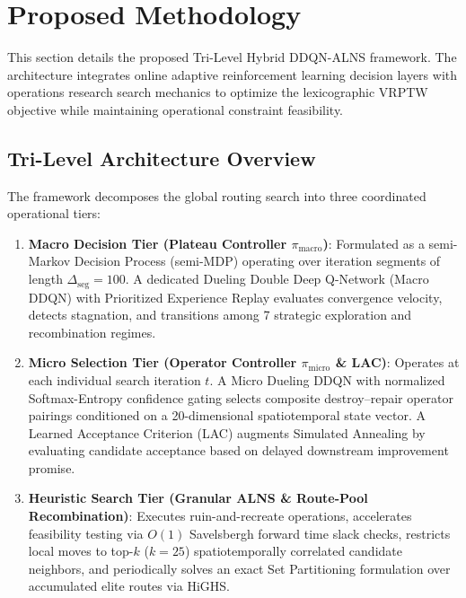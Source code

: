 \section{Proposed Methodology}
\label{sec:methodology}

This section details the proposed Tri-Level Hybrid DDQN-ALNS framework. The architecture integrates online adaptive reinforcement learning decision layers with operations research search mechanics to optimize the lexicographic VRPTW objective while maintaining operational constraint feasibility.

\subsection{Tri-Level Architecture Overview}
\label{sec:arch_overview}

The framework decomposes the global routing search into three coordinated operational tiers:
\begin{enumerate}
    \item \textbf{Macro Decision Tier (Plateau Controller $\pi_{\text{macro}}$)}: Formulated as a semi-Markov Decision Process (semi-MDP) operating over iteration segments of length $\Delta_{\text{seg}} = 100$. A dedicated Dueling Double Deep Q-Network (Macro DDQN) with Prioritized Experience Replay evaluates convergence velocity, detects stagnation, and transitions among 7 strategic exploration and recombination regimes.
    \item \textbf{Micro Selection Tier (Operator Controller $\pi_{\text{micro}}$ \& LAC)}: Operates at each individual search iteration $t$. A Micro Dueling DDQN with normalized Softmax-Entropy confidence gating selects composite destroy--repair operator pairings conditioned on a 20-dimensional spatiotemporal state vector. A Learned Acceptance Criterion (LAC) augments Simulated Annealing by evaluating candidate acceptance based on delayed downstream improvement promise.
    \item \textbf{Heuristic Search Tier (Granular ALNS \& Route-Pool Recombination)}: Executes ruin-and-recreate operations, accelerates feasibility testing via $O(1)$ Savelsbergh forward time slack checks, restricts local moves to top-$k$ ($k=25$) spatiotemporally correlated candidate neighbors, and periodically solves an exact Set Partitioning formulation over accumulated elite routes via HiGHS.
\end{enumerate}

